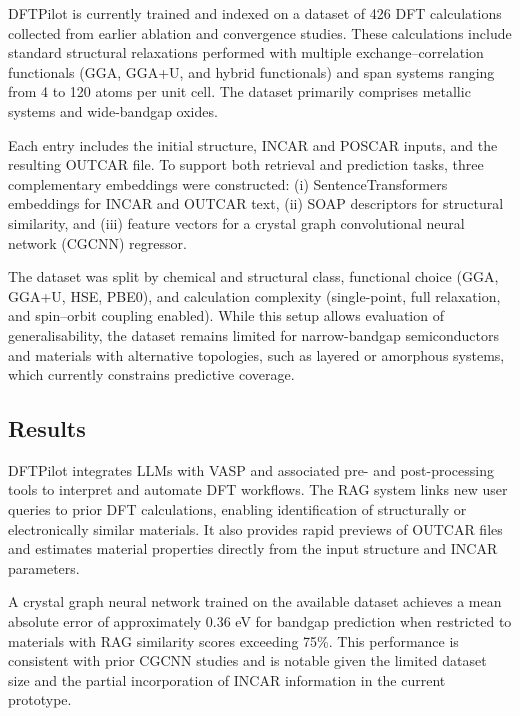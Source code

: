 DFTPilot is currently trained and indexed on a dataset of 426 DFT calculations collected from earlier ablation and convergence studies. These calculations include standard structural relaxations performed with multiple exchange–correlation functionals (GGA, GGA+U, and hybrid functionals) and span systems ranging from 4 to 120 atoms per unit cell. The dataset primarily comprises metallic systems and wide-bandgap oxides.

Each entry includes the initial structure, INCAR and POSCAR inputs, and the resulting OUTCAR file. To support both retrieval and prediction tasks, three complementary embeddings were constructed: (i) SentenceTransformers embeddings \cite{reimers2019sentencebert} for INCAR and OUTCAR text, (ii) SOAP descriptors \cite{himanen2020dscribe} for structural similarity, and (iii) feature vectors for a crystal graph convolutional neural network (CGCNN) \cite{xie2018crystal} regressor.

The dataset was split by chemical and structural class, functional choice (GGA, GGA+U, HSE, PBE0), and calculation complexity (single-point, full relaxation, and spin–orbit coupling enabled). While this setup allows evaluation of generalisability, the dataset remains limited for narrow-bandgap semiconductors and materials with alternative topologies, such as layered or amorphous systems, which currently constrains predictive coverage.


\subsection*{Results}

DFTPilot integrates LLMs with VASP \cite{kresse1993ab, kresse1996efficient} and associated pre- and post-processing tools to interpret and automate DFT workflows. The RAG system links new user queries to prior DFT calculations, enabling identification of structurally or electronically similar materials. It also provides rapid previews of OUTCAR files and estimates material properties directly from the input structure and INCAR parameters.

A crystal graph neural network trained on the available dataset achieves a mean absolute error of approximately 0.36 eV for bandgap prediction when restricted to materials with RAG similarity scores exceeding 75\%. This performance is consistent with prior CGCNN studies \cite{xie2018crystal} and is notable given the limited dataset size and the partial incorporation of INCAR information in the current prototype.

